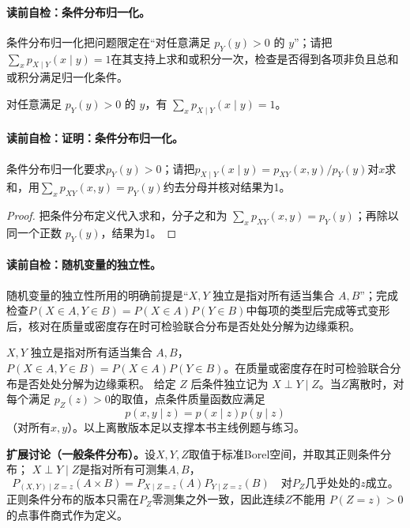 \label{struct:V1-C04-CH13}
\paragraph{读前自检：条件分布归一化。}条件分布归一化把问题限定在“对任意满足 $p_Y(y)>0$ 的 $y$”；请把$\sum_xp_{X\mid Y}(x\mid y)=1$在其支持上求和或积分一次，检查是否得到各项非负且总和或积分满足归一化条件。\par

\begin{lemma}[条件分布归一化]
对任意满足 $p_Y(y)>0$ 的 $y$，有 $\sum_xp_{X\mid Y}(x\mid y)=1$。
\end{lemma}
\paragraph{读前自检：证明：条件分布归一化。}条件分布归一化要求$p_Y(y)>0$；请把$p_{X\mid Y}(x\mid y)=p_{XY}(x,y)/p_Y(y)$对$x$求和，用$\sum_xp_{XY}(x,y)=p_Y(y)$约去分母并核对结果为1。\par

\begin{proof}
把条件分布定义代入求和，分子之和为 $\sum_xp_{XY}(x,y)=p_Y(y)$；再除以同一个正数 $p_Y(y)$，结果为1。
\end{proof}


\paragraph{读前自检：随机变量的独立性。}随机变量的独立性所用的明确前提是“$X,Y$ 独立是指对所有适当集合 $A,B$”；完成检查$P(X\in A,Y\in B)=P(X\in A)P(Y\in B)$中每项的类型后完成等式变形后，核对在质量或密度存在时可检验联合分布是否处处分解为边缘乘积。\par

$X,Y$ 独立是指对所有适当集合 $A,B$，$P(X\in A,Y\in B)=P(X\in A)P(Y\in B)$。在质量或密度存在时可检验联合分布是否处处分解为边缘乘积。
给定 $Z$ 后条件独立记为 $X\perp Y\mid Z$。当$Z$离散时，对每个满足
$p_Z(z)>0$的取值，点条件质量函数应满足
\[
p(x,y\mid z)=p(x\mid z)p(y\mid z)
\]
（对所有$x,y$）。以上离散版本足以支撑本书主线例题与练习。

\textbf{扩展讨论（一般条件分布）。}设$X,Y,Z$取值于标准Borel空间，并取其正则条件分布；
$X\perp Y\mid Z$是指对所有可测集$A,B$，
\[
P_{(X,Y)\mid Z=z}(A\times B)
=P_{X\mid Z=z}(A)P_{Y\mid Z=z}(B)
\quad\text{对$P_Z$几乎处处的$z$成立。}
\]
正则条件分布的版本只需在$P_Z$零测集之外一致，因此连续$Z$不能用
$P(Z=z)>0$的点事件商式作为定义。

